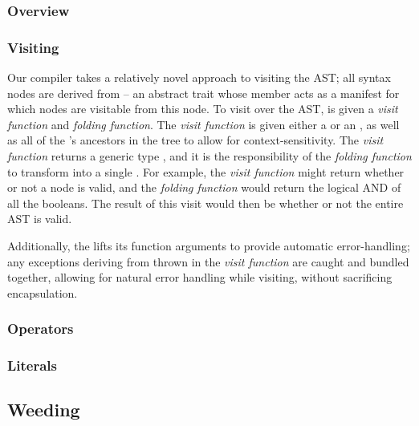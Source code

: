 \documentclass{article}
\begin{document}
\subsubsection{Overview}

\subsubsection{Visiting}

Our compiler takes a relatively novel approach to visiting the AST; all syntax nodes are derived from 
-- an abstract trait whose \value{children} member acts as a manifest for which nodes are visitable from this node. To
visit over the AST,  is given a \textit{visit function} and \textit{folding function}. The \textit{visit
function} is given either a \value{Before(Node)} or an \value{After(Node)}, as well as all of the \value{Node}'s
ancestors in the tree to allow for context-sensitivity. The \textit{visit function} returns a generic type ,
and it is the responsibility of the \textit{folding function} to transform  into a single . For
example, the \textit{visit function} might return whether or not a node is valid, and the \textit{folding function}
would return the logical AND of all the booleans. The result of this visit would then be whether or not the entire AST
is valid.

Additionally, the \value{Visitor} lifts its function arguments to provide automatic error-handling; any exceptions
deriving from  thrown in the \textit{visit function} are caught and bundled together, allowing for
natural error handling while visiting, without sacrificing encapsulation.





\subsubsection{Operators}

\subsubsection{Literals}






\subsection{Weeding}
\end{document}
